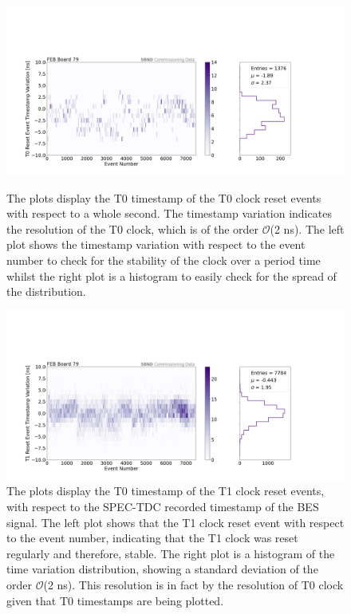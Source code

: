 \begin{figure}[htbp!] 
\centering    
\includegraphics[width=1.0\textwidth]{upstream_T0stability_combined_board79}
\caption[UpstreamT0StabilityCombinedBoard79]{
The plots display the T0 timestamp of the T0 clock reset events with respect to a whole second. 
The timestamp variation indicates the resolution of the T0 clock, which is of the order $\mathcal{O}$(2 ns).
The left plot shows the timestamp variation with respect to the event number to check for the stability of the clock over a period time whilst the right plot is a histogram to easily check for the spread of the distribution.
}
\label{fig:UpstreamT0StabilityCombinedBoard79}

\centering    
\includegraphics[width=1.0\textwidth]{upstream_T1stability_combined_board79}
\caption[UpstreamT1StabilityCombinedBoard79]{
The plots display the T0 timestamp of the T1 clock reset events, with respect to the SPEC-TDC recorded timestamp of the BES signal. 
The left plot shows that the T1 clock reset event with respect to the event number, indicating that the T1 clock was reset regularly and therefore, stable.
The right plot is a histogram of the time variation distribution, showing a standard deviation of the order $\mathcal{O}$(2 ns).
This resolution is in fact by the resolution of T0 clock given that T0 timestamps are being plotted. 
}
\label{fig:UpstreamT1StabilityCombinedBoard79}
\end{figure}

